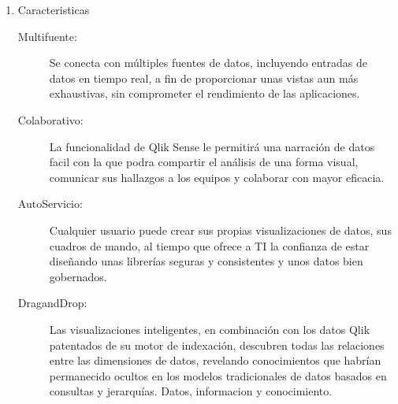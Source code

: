 \begin{enumerate}[1.]
        \begin{itemize}
         \item Transmitir el significado de los datos con visualizaciones inteligentes, innovadoras, completamente interactivas y con capacidad de reacci\'on.\\
         \item Explorar en cualqxuier direcci\'on: encuentrar datos e informaci\'on valiosa que las herramientas jerarquicas y basadas en consultas no detectan.\\
         \item Lograr una flexibilidad absoluta: solo tienes que escribir lo que necesites para encontrar información relacionada y ver datos relacionados en todo el conjunto de datos.\\
          \item Explorar m\'ultiples fuentes de datos: conectar y visualizar datos de varias fuentes para una vista m\'as exhaustiva.\\
          \item Narraci\'on de datos detallada: colaborar y compartir la informaci\'on extraida del an\'alisis visual. Comunicar mejor los hallazgos a su equipo. Moverte directamente entre historias y an\'alisis en directo para responder a preguntas y acelerar la toma de decisiones.\\
        \end{itemize}

         \item  Caracteristicas 
    
       \begin{description}
            \item[Multifuente:] Se conecta con m\'ultiples fuentes de datos, incluyendo entradas de datos en tiempo real, a fin de proporcionar unas vistas aun m\'as exhaustivas, sin comprometer el rendimiento de las aplicaciones.\\
            \item[Colaborativo:] La funcionalidad de Qlik Sense le permitir\'a una narraci\'on de datos facil con la que podra compartir el análisis de una forma visual, comunicar sus hallazgos a los equipos y colaborar con mayor eficacia.\\
            \item[AutoServicio:] Cualquier usuario puede crear sus propias visualizaciones de datos, sus cuadros de mando, al tiempo que ofrece a TI la confianza de estar diseñando unas librerías seguras y consistentes y unos datos bien gobernados.\\
            \item[DragandDrop:] Las visualizaciones inteligentes, en combinaci\'on con los datos Qlik patentados de su motor de indexaci\'on, descubren todas las relaciones entre las dimensiones de datos, revelando conocimientos que habr\'ian permanecido ocultos en los modelos tradicionales de datos basados en consultas y jerarqu\'ias. Datos, informacion y conocimiento.\\

        \end{description}
               


    
\end{enumerate}
